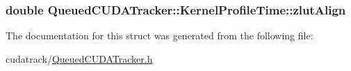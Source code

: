 \subsubsection[{\texorpdfstring{zlut\+Align}{zlutAlign}}]{\setlength{\rightskip}{0pt plus 5cm}double Queued\+C\+U\+D\+A\+Tracker\+::\+Kernel\+Profile\+Time\+::zlut\+Align}\hypertarget{struct_queued_c_u_d_a_tracker_1_1_kernel_profile_time_a140d7024006f4957e23b2cb85cba0edc}{}\label{struct_queued_c_u_d_a_tracker_1_1_kernel_profile_time_a140d7024006f4957e23b2cb85cba0edc}


The documentation for this struct was generated from the following file\+:\begin{DoxyCompactItemize}
\item 
cudatrack/\hyperlink{_queued_c_u_d_a_tracker_8h}{Queued\+C\+U\+D\+A\+Tracker.\+h}\end{DoxyCompactItemize}
